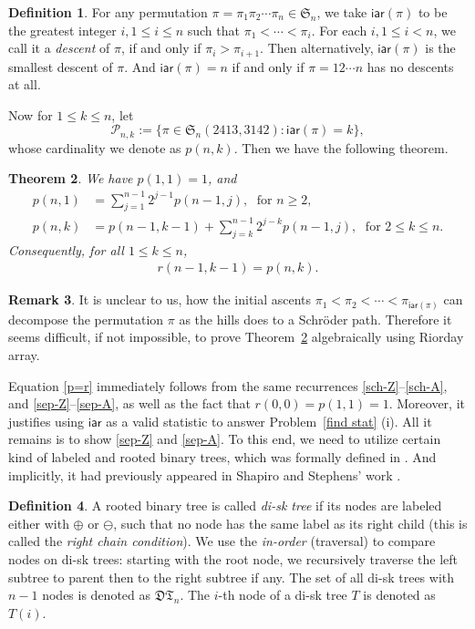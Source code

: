 \documentclass[11pt,reqno]{amsart}
\numberwithin{equation}{section}
\theoremstyle{plain}
\newtheorem{theorem}{Theorem}[section]
\theoremstyle{definition}
\newtheorem{Def}[theorem]{Definition}
\newtheorem{remark}[theorem]{Remark}
\newcommand{\PP}{\mathcal{P}}
\def\iar{\mathsf{iar}}
\begin{document}
\begin{Def}
For any permutation $\pi=\pi_1\pi_2\cdots\pi_n\in\mathfrak{S}_n$, we take $\iar(\pi)$ to be the greatest integer $i, 1\le i\le n$ such that $\pi_1<\cdots<\pi_{i}$. For each $i, 1\le i< n$, we call it a \emph{descent} of $\pi$, if and only if $\pi_i>\pi_{i+1}$. Then alternatively, $\iar(\pi)$ is the smallest descent of $\pi$. And $\iar(\pi)=n$ if and only if $\pi=12\cdots n$ has no descents at all.
\end{Def}

Now for $1\le k\le n$, let $$\PP_{n,k}:=\{\pi\in\mathfrak{S}_n(2413,3142):\iar(\pi)=k\},$$ whose cardinality we denote as $p(n,k)$. Then we have the following theorem.
\begin{theorem}\label{Sep-iar}
We have $p(1,1)=1$, and
\begin{align}
p(n,1) &=\sum_{j=1}^{n-1}2^{j-1}p(n-1,j), \; \text{ for }n\ge 2,\label{sep-Z}\\
p(n,k) &=p(n-1,k-1)+\sum_{j=k}^{n-1}2^{j-k}p(n-1,j),\; \text{ for }2\le k \le n.\label{sep-A}
\end{align}
Consequently, for all $1\le k\le n$,
\begin{align}
r(n-1,k-1)=p(n,k).\label{p=r}
\end{align}
\end{theorem}
\begin{remark}
It is unclear to us, how the initial ascents $\pi_1<\pi_2<\cdots<\pi_{\iar(\pi)}$ can decompose the permutation $\pi$ as the hills does to a Schr\"oder path. Therefore it seems difficult, if not impossible, to prove Theorem~\ref{Sep-iar} algebraically using Riorday array.
\end{remark}
Equation \eqref{p=r} immediately follows from the same recurrences \eqref{sch-Z}--\eqref{sch-A}, and \eqref{sep-Z}--\eqref{sep-A}, as well as the fact that $r(0,0)=p(1,1)=1$. Moreover, it justifies using $\iar$ as a valid statistic to answer Problem~\ref{find stat} (i). All it remains is to show \eqref{sep-Z} and \eqref{sep-A}. To this end, we need to utilize certain kind of labeled and rooted binary trees, which was formally defined in \cite{FLZ}. And implicitly, it had previously appeared in Shapiro and Stephens' work \cite{SS}.
\begin{Def}{\cite[Def.~2.2]{FLZ}}
A rooted binary tree is called \emph{di-sk tree} if its nodes are labeled either with $\oplus$ or $\ominus$, such that no node has the same label as its right child (this is called the \emph{right chain condition}). We use the \emph{in-order} (traversal) to compare nodes on di-sk trees: starting with the root node, we recursively traverse the left subtree to parent then to the right subtree if any. The set of all di-sk trees with $n-1$ nodes is denoted as $\mathfrak{DT}_{n}$. The $i$-th node of a di-sk tree $T$ is denoted as $T(i)$.
\end{Def}
\end{document}

